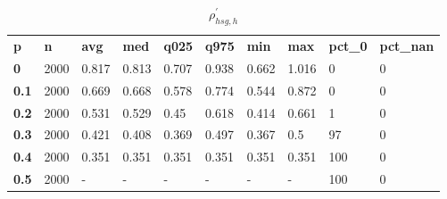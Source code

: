 \begin{table}[h]
 \centering 
\footnotesize
\caption{$\rho_{hsg,h}^\prime $}
\label{tab:alphahsgh}
\begin{tabular}[h]{| l l l l l l l l l l|
    } \hline
\textbf{ p} & \textbf{ n} & \textbf{ avg} & \textbf{ med} & \textbf{ q025} & \textbf{ q975} & \textbf{ min} & \textbf{ max} & \textbf{ pct\_0} & \textbf{ pct\_nan}
           \\
  \textbf{  0} & 2000 & 0.817 & 0.813 & 0.707 & 0.938 & 0.662 & 1.016 &   0 & 0
           \\
  \textbf{0.1} & 2000 & 0.669 & 0.668 & 0.578 & 0.774 & 0.544 & 0.872 &   0 & 0
           \\
  \textbf{0.2} & 2000 & 0.531 & 0.529 &  0.45 & 0.618 & 0.414 & 0.661 &   1 & 0
           \\
  \textbf{0.3} & 2000 & 0.421 & 0.408 & 0.369 & 0.497 & 0.367 &   0.5 &  97 & 0
           \\
  \textbf{0.4} & 2000 & 0.351 & 0.351 & 0.351 & 0.351 & 0.351 & 0.351 & 100 & 0
           \\
  \textbf{0.5} & 2000 & - & - & - & - & - & - & 100 & 0
           \\
 \hline \end{tabular}
 \end{table}
